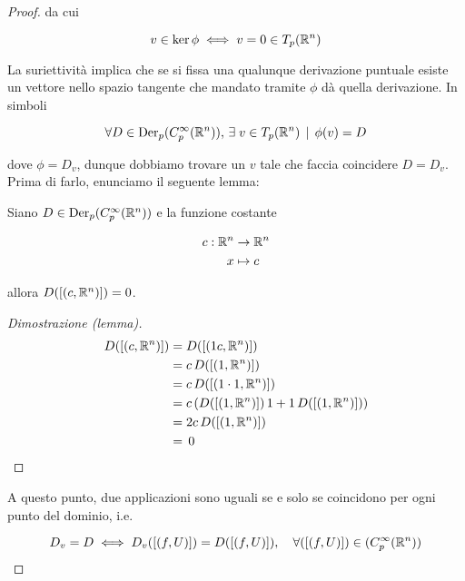 \begin{proof}
	da cui
	
	\begin{equation}
		v \in \ker \phi \iff v = 0 \in T_{p}(\mathbb{R}^{n})
	\end{equation}

	La suriettività implica che se si fissa una qualunque derivazione puntuale esiste un vettore nello spazio tangente che mandato tramite $ \phi $ dà quella derivazione. In simboli

	\begin{equation}
		\forall D \in \operatorname{Der}_{p} (C_{p}^{\infty}(\mathbb{R}^{n})), \, \exists \; v \in T_{p}(\mathbb{R}^{n}) \, \mid \, \phi(v) = D
	\end{equation}
	
	dove $ \phi = D_{v} $, dunque dobbiamo trovare un $ v $ tale che faccia coincidere $ D = D_{v} $.\\
	Prima di farlo, enunciamo il seguente lemma:

	\begin{lemma}
		Siano $ D \in \operatorname{Der}_{p} (C_{p}^{\infty}(\mathbb{R}^{n})) $ e la funzione costante
		
		\begin{align}
			\begin{split}
				c : \mathbb{R}^{n} &\to \mathbb{R}^{n}\\
				x &\mapsto c
			\end{split}
		\end{align}
	
		allora $ D([(c,\mathbb{R}^{n})]) = 0 $.
	\end{lemma}

	\begin{proof}[Dimostrazione (lemma)]
		\begin{align}
			\begin{split}
				D([(c,\mathbb{R}^{n})]) &= D([(1 c,\mathbb{R}^{n})])\\
				&= c \, D([(1,\mathbb{R}^{n})])\\
				&= c \, D([(1 \cdot 1,\mathbb{R}^{n})])\\
				&= c \, ( D([(1,\mathbb{R}^{n})]) \, 1 + 1 \, D([(1,\mathbb{R}^{n})]) )\\
				&= 2 c \, D([(1,\mathbb{R}^{n})])\\
				&= \, 0
			\end{split}
		\end{align}
	\end{proof}

	A questo punto, due applicazioni sono uguali se e solo se coincidono per ogni punto del dominio, i.e.
	
	\begin{equation}
		D_{v} = D \iff D_{v}([(f,U)]) = D([(f,U)]), \quad \forall ([(f,U)]) \in (C_{p}^{\infty}(\mathbb{R}^{n}))
	\end{equation}


\end{proof}
